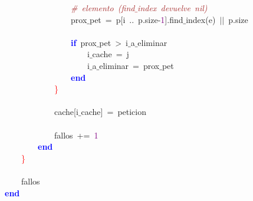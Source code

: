 \mbox{}\ \ \ \ \ \ \ \ \ \ \ \ \ \ \ \ \textit{\textcolor{Brown}{\#\ elemento\ (find$\_$index\ devuelve\ nil)}} \\
\mbox{}\ \ \ \ \ \ \ \ \ \ \ \ \ \ \ \ prox$\_$pet\ \textcolor{BrickRed}{=}\ p\textcolor{BrickRed}{[}i\ \textcolor{BrickRed}{..}\ p\textcolor{BrickRed}{.}size\textcolor{BrickRed}{-}\textcolor{Purple}{1}\textcolor{BrickRed}{].}find$\_$index\textcolor{BrickRed}{(}e\textcolor{BrickRed}{)}\ \textcolor{BrickRed}{$|$$|$}\ p\textcolor{BrickRed}{.}size \\
\mbox{} \\
\mbox{}\ \ \ \ \ \ \ \ \ \ \ \ \ \ \ \ \textbf{\textcolor{Blue}{if}}\ prox$\_$pet\ \textcolor{BrickRed}{\textgreater{}}\ i$\_$a$\_$eliminar \\
\mbox{}\ \ \ \ \ \ \ \ \ \ \ \ \ \ \ \ \ \ \ \ i$\_$cache\ \textcolor{BrickRed}{=}\ j \\
\mbox{}\ \ \ \ \ \ \ \ \ \ \ \ \ \ \ \ \ \ \ \ i$\_$a$\_$eliminar\ \textcolor{BrickRed}{=}\ prox$\_$pet \\
\mbox{}\ \ \ \ \ \ \ \ \ \ \ \ \ \ \ \ \textbf{\textcolor{Blue}{end}} \\
\mbox{}\ \ \ \ \ \ \ \ \ \ \ \ \textcolor{Red}{\}} \\
\mbox{} \\
\mbox{}\ \ \ \ \ \ \ \ \ \ \ \ cache\textcolor{BrickRed}{[}i$\_$cache\textcolor{BrickRed}{]}\ \textcolor{BrickRed}{=}\ peticion \\
\mbox{} \\
\mbox{}\ \ \ \ \ \ \ \ \ \ \ \ fallos\ \textcolor{BrickRed}{+=}\ \textcolor{Purple}{1} \\
\mbox{}\ \ \ \ \ \ \ \ \textbf{\textcolor{Blue}{end}} \\
\mbox{}\ \ \ \ \textcolor{Red}{\}} \\
\mbox{} \\
\mbox{}\ \ \ \ fallos \\
\mbox{}\textbf{\textcolor{Blue}{end}} \\
\mbox{}
